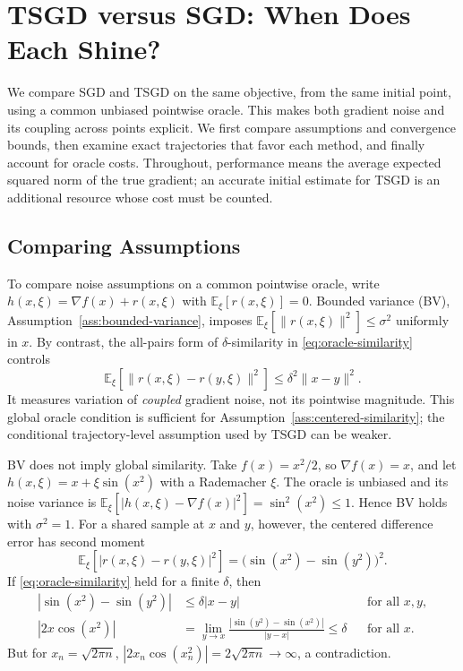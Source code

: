 \section{TSGD versus SGD: When Does Each Shine?}
\label{sec:sgd-tsgd-comparison}

We compare SGD and TSGD on the same objective, from the same initial
point, using a common unbiased pointwise oracle. This makes both
gradient noise and its coupling across points explicit. We first
compare assumptions and convergence bounds, then examine exact
trajectories that favor each method, and finally account for oracle
costs. Throughout, performance means the average expected squared
norm of the true gradient; an accurate initial estimate for TSGD is
an additional resource whose cost must be counted.

\subsection{Comparing Assumptions}
\label{subsec:comparing-assumptions}

To compare noise assumptions on a common pointwise oracle, write
$h(x,\xi)=\nabla f(x)+r(x,\xi)$ with
$\mathbb{E}_{\xi}[r(x,\xi)]=0$. Bounded variance (BV),
Assumption~\ref{ass:bounded-variance}, imposes
$\mathbb{E}_{\xi}[\|r(x,\xi)\|^2]\leq\sigma^2$ uniformly in $x$.
By contrast, the all-pairs form of $\delta$-similarity in
\eqref{eq:oracle-similarity} controls
\[
\mathbb{E}_{\xi}
  [\|r(x,\xi)-r(y,\xi)\|^2]
\leq\delta^2\|x-y\|^2.
\]
It measures variation of \emph{coupled} gradient noise, not its
pointwise magnitude. This global oracle condition is sufficient for
Assumption~\ref{ass:centered-similarity}; the conditional
trajectory-level assumption used by TSGD can be weaker.

BV does not imply global similarity. Take
$f(x)=x^2/2$, so $\nabla f(x)=x$, and let
$h(x,\xi)=x+\xi\sin(x^2)$ with a Rademacher $\xi$.
The oracle is unbiased and its noise variance is
$\mathbb E_{\xi}[|h(x,\xi)-\nabla f(x)|^2]=\sin^2(x^2)\leq1$.
Hence BV holds with $\sigma^2=1$. For a shared sample at $x$ and $y$,
however, the centered difference error has second moment
\[
\mathbb E_{\xi}[|r(x,\xi)-r(y,\xi)|^2]
=\bigl(\sin(x^2)-\sin(y^2)\bigr)^2.
\]
If \eqref{eq:oracle-similarity} held for a finite $\delta$, then
\[
\begin{aligned}
|\sin(x^2)-\sin(y^2)|
&\leq\delta|x-y| &&\text{for all }x,y,\\
|2x\cos(x^2)|
&=\lim_{y\to x}
  \frac{|\sin(y^2)-\sin(x^2)|}{|y-x|}
\leq\delta &&\text{for all }x.
\end{aligned}
\]
But for $x_n=\sqrt{2\pi n}$,
$|2x_n\cos(x_n^2)|=2\sqrt{2\pi n}\to\infty$, a contradiction.

